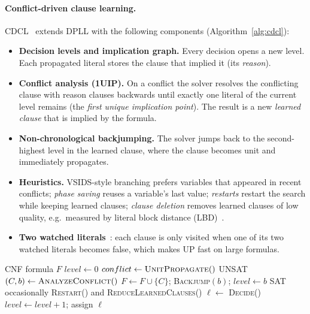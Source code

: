 \paragraph{Conflict-driven clause learning.}
CDCL~\cite{marques2009} extends DPLL with the following components (Algorithm~\ref{alg:cdcl}):
\begin{itemize}
  \item \textbf{Decision levels and implication graph.} Every decision opens a new level. Each propagated literal stores the clause that implied it (its \emph{reason}).
  \item \textbf{Conflict analysis (1UIP).} On a conflict the solver resolves the conflicting clause with reason clauses backwards until exactly one literal of the current level remains (the \emph{first unique implication point}). The result is a new \emph{learned clause} that is implied by the formula.
  \item \textbf{Non-chronological backjumping.} The solver jumps back to the second-highest level in the learned clause, where the clause becomes unit and immediately propagates.
  \item \textbf{Heuristics.} VSIDS-style branching prefers variables that appeared in recent conflicts; \emph{phase saving} reuses a variable's last value; \emph{restarts} restart the search while keeping learned clauses; \emph{clause deletion} removes learned clauses of low quality, e.g.\ measured by literal block distance (LBD)~\cite{audemard2009}.
  \item \textbf{Two watched literals}~\cite{moskewicz2001}: each clause is only visited when one of its two watched literals becomes false, which makes UP fast on large formulas.
\end{itemize}

\begin{algorithm}[htbp]
\caption{CDCL (simplified)}\label{alg:cdcl}
\begin{algorithmic}[1]
\Require CNF formula $F$
\State $level \gets 0$
\Loop
  \State $conflict \gets \textsc{UnitPropagate}()$
     \Return UNSAT \EndIf
    \State $(C, b) \gets \textsc{AnalyzeConflict}()$ 
    \State $F \gets F \cup \{C\}$;\; \textsc{Backjump}$(b)$;\; $level \gets b$
    \State \Return SAT
  \Else
    \State occasionally \textsc{Restart}() and \textsc{ReduceLearnedClauses}()
    \State $\ell \gets$ \textsc{Decide}() 
    \State $level \gets level+1$; assign $\ell$
  \EndIf
\EndLoop
\end{algorithmic}
\end{algorithm}

